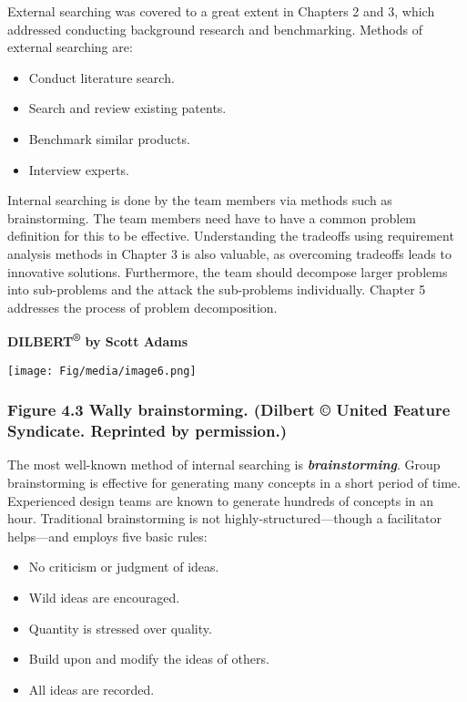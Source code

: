 External searching was covered to a great extent in Chapters 2 and 3,
which addressed conducting background research and benchmarking. Methods
of external searching are:

\begin{itemize}
\item
  Conduct literature search.
\item
  Search and review existing patents.
\item
  Benchmark similar products.
\item
  Interview experts.
\end{itemize}

Internal searching is done by the team members via methods such as
brainstorming. The team members need have to have a common problem
definition for this to be effective. Understanding the tradeoffs using
requirement analysis methods in Chapter 3 is also valuable, as
overcoming tradeoffs leads to innovative solutions. Furthermore, the
team should decompose larger problems into sub-problems and the attack
the sub-problems individually. Chapter 5 addresses the process of
problem decomposition.

\textbf{DILBERT\textsuperscript{®} by Scott Adams}

\texttt{[image: Fig/media/image6.png]}

\subsubsection*{Figure 4.3 Wally brainstorming. (Dilbert © United
Feature Syndicate. Reprinted by
permission.)}\label{figure-4.3-wally-brainstorming.-dilbert-united-feature-syndicate.-reprinted-by-permission.}

The most well-known method of internal searching is
\emph{\textbf{brainstorming}}. Group brainstorming is effective for
generating many concepts in a short period of time. Experienced design
teams are known to generate hundreds of concepts in an hour. Traditional
brainstorming is not highly-structured---though a facilitator
helps---and employs five basic rules:

\begin{itemize}
\item
  No criticism or judgment of ideas.
\item
  Wild ideas are encouraged.
\item
  Quantity is stressed over quality.
\item
  Build upon and modify the ideas of others.
\item
  All ideas are recorded.
\end{itemize}

